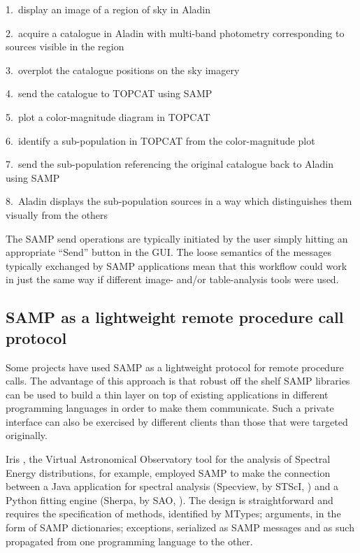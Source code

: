 1.\ display an image of a region of sky in Aladin

2.\ acquire a catalogue in Aladin with multi-band photometry
    corresponding to sources visible in the region

3.\ overplot the catalogue positions on the sky imagery

4.\ send the catalogue to TOPCAT using SAMP

5.\ plot a color-magnitude diagram in TOPCAT

6.\ identify a sub-population in TOPCAT from the color-magnitude plot

7.\ send the sub-population referencing the original catalogue
    back to Aladin using SAMP

8.\ Aladin displays the sub-population sources in a way which
    distinguishes them visually from the others

The SAMP send operations are typically initiated by the user
simply hitting an appropriate ``Send'' button in the GUI.
The loose semantics of the messages typically exchanged by SAMP
applications mean that this workflow could work in just the same
way if different image- and/or table-analysis tools were used.

\subsection{SAMP as a lightweight remote procedure call protocol}

Some projects have used SAMP as a lightweight protocol for remote procedure
calls. The advantage of this approach is that robust off the shelf SAMP
libraries can be used to build a thin layer on top of existing applications
in different programming languages in order to make them communicate. Such
a private interface can also be exercised by different clients than those
that were targeted originally.

Iris \citep{2012ASPC..461..893D}, the Virtual Astronomical Observatory
tool for the analysis of Spectral Energy distributions, for example,
employed SAMP to make the connection between a Java application for
spectral analysis (Specview, by STScI, \citet{2000ASPC..216...79B}) and a
Python fitting engine (Sherpa, by SAO, \citet{2007ASPC..376..543D}). The
design is straightforward and requires the specification of methods,
identified by MTypes; arguments, in the form of SAMP dictionaries;
exceptions, serialized as SAMP messages and as such propagated from one
programming language to the other.

